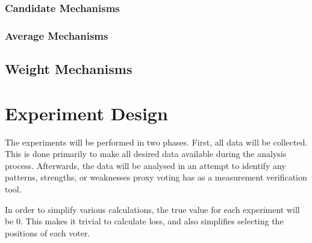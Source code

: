 \subsubsection{Candidate Mechanisms}\label{subsubsec:candidate-mechanisms}
%

\subsubsection{Average Mechanisms}\label{subsubsec:average-mechanisms}
%

\subsection{Weight Mechanisms}\label{subsec:weight-mechanisms}
%


\section{Experiment Design}\label{sec:experiment-design}
%
%

The experiments will be performed in two phases.
First, all data will be collected.
This is done primarily to make all desired data available during the analysis
process.
Afterwards, the data will be analysed in an attempt to identify any patterns,
strengths, or weaknesses proxy voting has as a measurement verification tool.

In order to simplify various calculations, the true value for each experiment
will be 0.
This makes it trivial to calculate loss, and also simplifies selecting the
positions of each voter.

